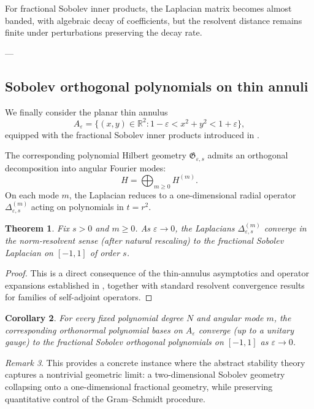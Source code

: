 \documentclass{amsart}
\numberwithin{equation}{section}
\newtheorem{theorem}{Theorem}[section]
\newtheorem{corollary}[theorem]{Corollary}
\theoremstyle{definition}
\theoremstyle{remark}
\newtheorem{remark}[theorem]{Remark}
\begin{document}
For fractional Sobolev inner products, the Laplacian matrix becomes almost banded,
with algebraic decay of coefficients, but the resolvent distance remains finite
under perturbations preserving the decay rate.

---

\subsection{Sobolev orthogonal polynomials on thin annuli}

We finally consider the planar thin annulus
\[
A_\varepsilon=\{(x,y)\in\mathbb R^2:1-\varepsilon<x^2+y^2<1+\varepsilon\},
\]
equipped with the fractional Sobolev inner products introduced in
\cite{MagnotThinAnnuli}.

The corresponding polynomial Hilbert geometry $\mathfrak G_{\varepsilon,s}$
admits an orthogonal decomposition into angular Fourier modes:
\[
H=\bigoplus_{m\ge0} H^{(m)}.
\]
On each mode $m$, the Laplacian reduces to a one-dimensional radial operator
$\Delta^{(m)}_{\varepsilon,s}$ acting on polynomials in $t=r^2$.

\begin{theorem}
Fix $s>0$ and $m\ge0$.
As $\varepsilon\to0$, the Laplacians $\Delta^{(m)}_{\varepsilon,s}$
converge in the norm-resolvent sense (after natural rescaling)
to the fractional Sobolev Laplacian on $[-1,1]$ of order $s$.
\end{theorem}

\begin{proof}
This is a direct consequence of the thin-annulus asymptotics and operator
expansions established in \cite{MagnotThinAnnuli}, together with standard
resolvent convergence results for families of self-adjoint operators.
\end{proof}

\begin{corollary}
For every fixed polynomial degree $N$ and angular mode $m$,
the corresponding orthonormal polynomial bases on $A_\varepsilon$
converge (up to a unitary gauge) to the fractional Sobolev orthogonal polynomials
on $[-1,1]$ as $\varepsilon\to0$.
\end{corollary}

\begin{remark}
This provides a concrete instance where the abstract stability theory
captures a nontrivial geometric limit: a two-dimensional Sobolev geometry
collapsing onto a one-dimensional fractional geometry, while preserving
quantitative control of the Gram--Schmidt procedure.
\end{remark}
\end{document}
